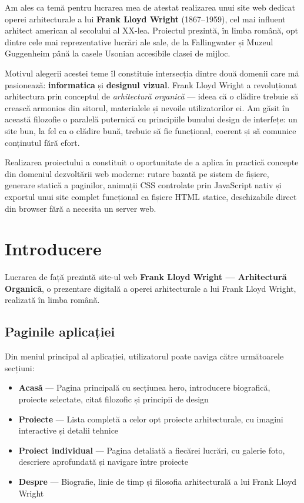 \documentclass[12pt,a4paper]{report}
\begin{document}
Am ales ca temă pentru lucrarea mea de atestat realizarea unui site web dedicat
operei arhitecturale a lui \textbf{Frank Lloyd Wright} (1867--1959), cel mai
influent arhitect american al secolului al XX-lea. Proiectul prezintă, în limba
română, opt dintre cele mai reprezentative lucrări ale sale, de la Fallingwater
și Muzeul Guggenheim până la casele Usonian accesibile clasei de mijloc.

Motivul alegerii acestei teme îl constituie intersecția dintre două domenii care
mă pasionează: \textbf{informatica} și \textbf{designul vizual}. Frank Lloyd
Wright a revoluționat arhitectura prin conceptul de \emph{arhitectură organică}
--- ideea că o clădire trebuie să crească armonios din sitorul, materialele și
nevoile utilizatorilor ei. Am găsit în această filozofie o paralelă puternică
cu principiile bunului design de interfețe: un site bun, la fel ca o clădire
bună, trebuie să fie funcțional, coerent și să comunice conținutul fără efort.

Realizarea proiectului a constituit o oportunitate de a aplica în practică
concepte din domeniul dezvoltării web moderne: rutare bazată pe sistem de fișiere,
generare statică a paginilor, animații CSS controlate prin JavaScript nativ și
exportul unui site complet funcțional ca fișiere HTML statice, deschizabile
direct din browser fără a necesita un server web.

\chapter{Introducere}

Lucrarea de față prezintă site-ul web \textbf{Frank Lloyd Wright --- Arhitectură
Organică}, o prezentare digitală a operei arhitecturale a lui Frank Lloyd Wright,
realizată în limba română.

\section{Paginile aplicației}

Din meniul principal al aplicației, utilizatorul poate naviga către următoarele
secțiuni:

\begin{itemize}
  \item \textbf{Acasă} --- Pagina principală cu secțiunea hero, introducere
        biografică, proiecte selectate, citat filozofic și principii de design
  \item \textbf{Proiecte} --- Lista completă a celor opt proiecte arhitecturale,
        cu imagini interactive și detalii tehnice
  \item \textbf{Proiect individual} --- Pagina detaliată a fiecărei lucrări, cu
        galerie foto, descriere aprofundată și navigare între proiecte
  \item \textbf{Despre} --- Biografie, linie de timp și filosofia arhitecturală
        a lui Frank Lloyd Wright
\end{itemize}
\end{document}
